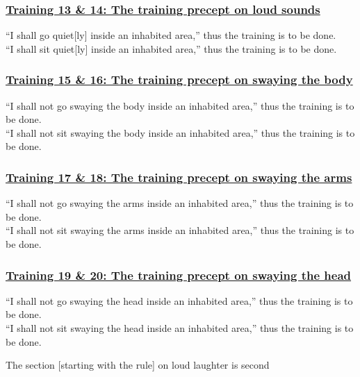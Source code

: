 \subsubsection*{\hyperref[sekh13-14]{Training 13 \& 14: The training precept on loud sounds}}
\label{training13-14}
``I shall go quiet[ly] inside an inhabited area,'' thus the training is to be done.\\
``I shall sit quiet[ly] inside an inhabited area,'' thus the training is to be done.



\subsubsection*{\hyperref[sekh15-16]{Training 15 \& 16: The training precept on swaying the body}}
\label{training15-16}
``I shall not go swaying the body inside an inhabited area,'' thus the training is to be done.\\
``I shall not sit swaying the body inside an inhabited area,'' thus the training is to be done.



\subsubsection*{\hyperref[sekh17-18]{Training 17 \& 18: The training precept on swaying the arms}}
\label{training17-18}
``I shall not go swaying the arms inside an inhabited area,'' thus the training is to be done.\\
``I shall not sit swaying the arms inside an inhabited area,'' thus the training is to be done.



\subsubsection*{\hyperref[sekh19-20]{Training 19 \& 20: The training precept on swaying the head}}
\label{training19-20}
``I shall not go swaying the head inside an inhabited area,'' thus the training is to be done.\\
``I shall not sit swaying the head inside an inhabited area,'' thus the training is to be done.

\begin{center}
	The section [starting with the rule] on loud laughter is second
\end{center}



